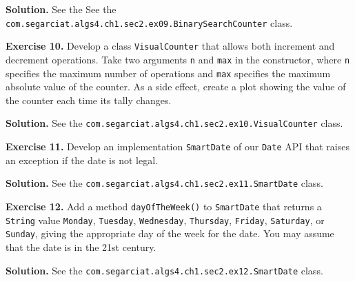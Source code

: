 \documentclass[12pt, a4paper]{article}
\newenvironment{ex}[2][Exercise]
{\par\medskip\noindent \textbf{#1 #2.}}
{\medskip}
\newenvironment{sol}[1][Solution]
{\par\medskip\noindent \textbf{#1.} }
{\medskip}
\begin{document}
	\begin{sol}
		See the See the \texttt{com.segarciat.algs4.ch1.sec2.ex09.BinarySearchCounter} class.
	\end{sol}
	\begin{ex}{10}
		Develop a class \texttt{VisualCounter} that allows both increment and decrement
		operations. Take two arguments \texttt{n} and \texttt{max} in the constructor,
		where \texttt{n} specifies the maximum number of operations and \texttt{max} specifies
		the maximum absolute value of the counter. As a side effect, create a plot showing the
		value of the counter each time its tally changes.
	\end{ex}
	\begin{sol}
		See the \texttt{com.segarciat.algs4.ch1.sec2.ex10.VisualCounter} class.
	\end{sol}
	\begin{ex}{11}
		Develop an implementation \texttt{SmartDate} of our \texttt{Date} API that raises
		an exception if the date is not legal.
	\end{ex}
	\begin{sol}
		See the \texttt{com.segarciat.algs4.ch1.sec2.ex11.SmartDate} class.
	\end{sol}
	\begin{ex}{12}
		Add a method \texttt{dayOfTheWeek()} to \texttt{SmartDate} that returns a \texttt{String}
		value \texttt{Monday}, \texttt{Tuesday}, \texttt{Wednesday}, \texttt{Thursday},
		\texttt{Friday}, \texttt{Saturday}, or \texttt{Sunday}, giving the appropriate
		day of the week for the date. You may assume that the date is in the 21st  century.
	\end{ex}
	\begin{sol}
		See the \texttt{com.segarciat.algs4.ch1.sec2.ex12.SmartDate} class.
	\end{sol}
	\pagebreak
	\printbibliography
\end{document}
